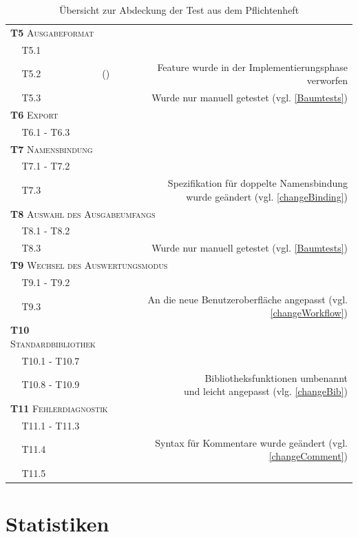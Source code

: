 \documentclass[parskip=full,11pt,openany]{scrreprt}
\newcommand{\cmark}{\ding{51}}%
\newcommand{\xmark}{\ding{55}}%
\begin{document}
\begin{table}[h]
\begin{tabular}{@{}ll|c|r@{}}
		\multicolumn{3}{l|}{\small \textsc{\textbf{T5} Ausgabeformat}}\\ 
		&T5.1 & \cmark & \\
		&T5.2 & (\xmark) & Feature wurde in der Implementierungsphase verworfen\\
		&T5.3 & \xmark & Wurde nur manuell getestet (vgl. \ref{Baumtests})\\
		\multicolumn{2}{l|}{\small \textsc{\textbf{T6} Export}} & &\\ 
		&T6.1 - T6.3 & \cmark & \\
		\multicolumn{3}{l|}{\small \textsc{\textbf{T7} Namensbindung}}\\ 
		&T7.1 - T7.2 & \cmark & \\
		&T7.3 & \cmark & \makecell[r]{Spezifikation für doppelte Namensbindung\\wurde geändert (vgl. \ref{changeBinding})} \\
		\multicolumn{4}{l}{\small \textsc{\textbf{T8} Auswahl des Ausgabeumfangs}}\\ 
		&T8.1 - T8.2 & \cmark & \\
		&T8.3 & \xmark & Wurde nur manuell getestet (vgl. \ref{Baumtests})\\
		\multicolumn{4}{l}{\small \textsc{\textbf{T9} Wechsel des Auswertungsmodus}}\\ 
		&T9.1 - T9.2 & \cmark & \\
		&T9.3 & \cmark & An die neue Benutzeroberfläche angepasst  (vgl. \ref{changeWorkflow})\\
		\multicolumn{3}{l|}{\small \textsc{\textbf{T10} Standardbibliothek}}\\ 
		&T10.1 - T10.7 & \cmark & \\
		&T10.8 - T10.9 & \cmark & \makecell[r]{Bibliotheksfunktionen umbenannt\\und leicht angepasst (vlg. \ref{changeBib})} \\
		\multicolumn{3}{l|}{\small \textsc{\textbf{T11} Fehlerdiagnostik}}\\ 
		&T11.1 - T11.3 & \cmark & \\
		&T11.4 & \cmark & Syntax für Kommentare wurde geändert (vgl. \ref{changeComment}) \\
		&T11.5 & \cmark & \\
		\bottomrule
	\end{tabular}
	\caption{Übersicht zur Abdeckung der Test aus dem Pflichtenheft}
\end{table}

\section{Statistiken}
\end{document}

